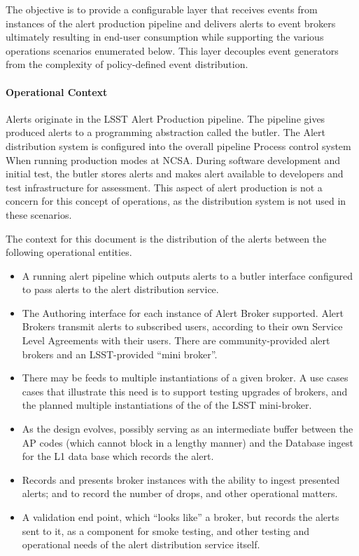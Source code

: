 The objective is to provide a configurable layer that receives events from instances of the alert production pipeline and delivers alerts to event brokers ultimately resulting in end-user consumption while supporting the various operations scenarios enumerated below. This layer decouples event generators from the complexity of policy-defined event distribution. 

\paragraph{Operational Context}
Alerts originate in the LSST Alert Production pipeline.  The pipeline gives produced alerts to a programming abstraction called the butler.   The Alert distribution system is configured into the overall pipeline Process control system  When running production modes at NCSA.
During software development and initial test, the butler stores alerts and makes alert available to developers and test infrastructure for assessment. This aspect of alert production is not a concern for this concept of operations, as the distribution system is not used in these scenarios.

The context for this document is the distribution of the alerts between the following operational entities. 

\begin{itemize}
\item A running alert pipeline which outputs alerts to a butler interface configured to pass alerts to the alert distribution service.

\item The Authoring interface for each instance of Alert Broker supported. Alert Brokers transmit alerts to subscribed users, according to their own Service Level Agreements with their users.  There are community-provided alert brokers and an LSST-provided “mini broker”.  

\item There may be feeds to multiple instantiations of a given broker. A use cases cases that illustrate this need is to support testing upgrades of brokers, and the planned multiple instantiations of the of the LSST mini-broker.

\item As the  design evolves, possibly serving as an intermediate buffer between the AP codes (which cannot block in a lengthy manner)  and the Database ingest for the L1 data base which records the alert.

\item Records and presents broker instances with the ability to ingest presented alerts; and to record the number of drops, and other operational matters.  

\item A validation end point, which “looks like” a broker, but records the alerts sent to it, as a component for smoke testing, and other testing and operational needs of the alert distribution service itself.

\end{itemize}

